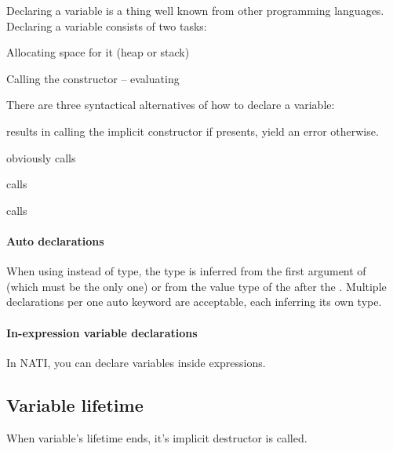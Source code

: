 Declaring a variable is a thing well known from other programming languages. Declaring a variable consists of two tasks:
\begin{compactenum}
	\item Allocating space for it (heap or stack)
	\item Calling the constructor -- evaluating 
\end{compactenum}

There are three syntactical alternatives of how to declare a variable:
\begin{compactitem}
	\item {} results in calling the implicit constructor  if presents, yield an error otherwise.
	\item {} obviously calls 
	\item {} calls 
	\item {} calls  %
\end{compactitem}

\paragraph{Auto declarations}
When using  instead of type, the type is inferred from the first argument of  (which must be the only one) or from the value type of the  after the \kwd{=}. Multiple declarations per one auto keyword are acceptable, each inferring its own type.

\paragraph{In-expression variable declarations}
In NATI, you can declare variables inside expressions.

\subsection{Variable lifetime}
When variable's lifetime ends, it's implicit destructor  is called.

